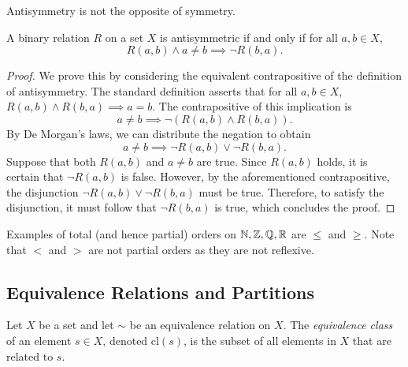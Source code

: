 \documentclass[../ium.tex]{subfiles}
\begin{document}
\begin{remark}
Antisymmetry is not the opposite of symmetry.
\end{remark}

\begin{lemma}
\begin{shaded*}
A binary relation $R$ on a set $X$ is antisymmetric if and only if for all $a, b \in X$,
\[
R(a, b) \land a \ne b \implies \neg R(b, a).
\]
\end{shaded*}
\end{lemma}
\begin{proof}
We prove this by considering the equivalent contrapositive of the definition of antisymmetry. The standard definition asserts that for all $a, b \in X$, $R(a,b) \land R(b,a) \implies a=b$. The contrapositive of this implication is 
\[
a \ne b \implies \neg(R(a,b) \land R(b,a)).
\]
By De Morgan's laws, we can distribute the negation to obtain 
\[
a \ne b \implies \neg R(a,b) \lor \neg R(b,a).
\]
Suppose that both $R(a,b)$ and $a \ne b$ are true. Since $R(a,b)$ holds, it is certain that $\neg R(a,b)$ is false. However, by the aforementioned contrapositive, the disjunction $\neg R(a,b) \lor \neg R(b,a)$ must be true. Therefore, to satisfy the disjunction, it must follow that $\neg R(b,a)$ is true, which concludes the proof.
\end{proof}

\begin{remark}
Examples of total (and hence partial) orders on $\mathbb{N}, \mathbb{Z}, \mathbb{Q}, \mathbb{R}$ are $\le$ and $\ge$. Note that $<$ and $>$ are not partial orders as they are not reflexive.
\end{remark}

\subsection*{Equivalence Relations and Partitions}

\begin{definition}
\begin{shaded*}
Let $X$ be a set and let $\sim$ be an equivalence relation on $X$. The \textit{equivalence class} of an element $s \in X$, denoted $\mathrm{cl}(s)$, is the subset of all elements in $X$ that are related to $s$.
\end{shaded*}
\end{definition}
\end{document}

